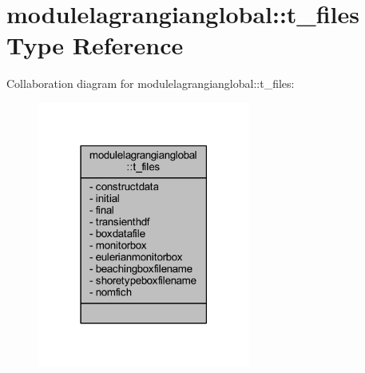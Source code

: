 \hypertarget{structmodulelagrangianglobal_1_1t__files}{}\section{modulelagrangianglobal\+:\+:t\+\_\+files Type Reference}
\label{structmodulelagrangianglobal_1_1t__files}


Collaboration diagram for modulelagrangianglobal\+:\+:t\+\_\+files\+:\nopagebreak
\begin{figure}[H]
\begin{center}
\leavevmode
\includegraphics[width=198pt]{structmodulelagrangianglobal_1_1t__files__coll__graph}
\end{center}
\end{figure}
